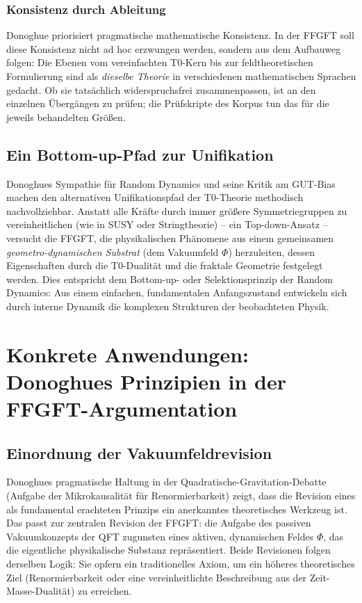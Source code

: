 	\subsubsection{Konsistenz durch Ableitung}
	Donoghue priorisiert pragmatische mathematische Konsistenz. In der FFGFT soll diese Konsistenz nicht ad hoc erzwungen werden, sondern aus dem Aufbauweg folgen: Die Ebenen vom vereinfachten T0-Kern bis zur feldtheoretischen Formulierung sind als \emph{dieselbe Theorie} in verschiedenen mathematischen Sprachen gedacht. Ob sie tatsächlich widerspruchsfrei zusammenpassen, ist an den einzelnen Übergängen zu prüfen; die Prüfskripte des Korpus tun das für die jeweils behandelten Größen.
	
	\subsection{Ein Bottom-up-Pfad zur Unifikation}
	
	Donoghues Sympathie für Random Dynamics und seine Kritik am GUT-Bias machen den alternativen Unifikationspfad der T0-Theorie methodisch nachvollziehbar. Anstatt alle Kräfte durch immer größere Symmetriegruppen zu vereinheitlichen (wie in SUSY oder Stringtheorie) – ein Top-down-Ansatz – versucht die FFGFT, die physikalischen Phänomene aus einem gemeinsamen \emph{geometro-dynamischen Substrat} (dem Vakuumfeld $\Phi$) herzuleiten, dessen Eigenschaften durch die T0-Dualität und die fraktale Geometrie festgelegt werden. Dies entspricht dem Bottom-up- oder Selektionsprinzip der Random Dynamics: Aus einem einfachen, fundamentalen Anfangszustand entwickeln sich durch interne Dynamik die komplexen Strukturen der beobachteten Physik.
	
	\section{Konkrete Anwendungen: Donoghues Prinzipien in der FFGFT-Argumentation}
	
	\subsection{Einordnung der Vakuumfeldrevision}
	Donoghues pragmatische Haltung in der Quadratische-Gravitation-Debatte (Aufgabe der Mikrokausalität für Renormierbarkeit) zeigt, dass die Revision eines als fundamental erachteten Prinzips ein anerkanntes theoretisches Werkzeug ist. Das passt zur zentralen Revision der FFGFT: die Aufgabe des passiven Vakuumkonzepts der QFT zugunsten eines aktiven, dynamischen Feldes $\Phi$, das die eigentliche physikalische Substanz repräsentiert. Beide Revisionen folgen derselben Logik: Sie opfern ein traditionelles Axiom, um ein höheres theoretisches Ziel (Renormierbarkeit oder eine vereinheitlichte Beschreibung aus der Zeit-Masse-Dualität) zu erreichen.
	
